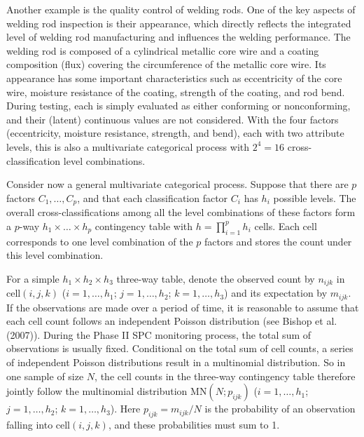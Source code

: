 Another example is the quality control of welding rods. One of the key aspects of
welding rod inspection is their appearance, which directly reflects the integrated
level of welding rod manufacturing and influences the welding performance. The
welding rod is composed of a cylindrical metallic core wire and a coating
composition (flux) covering the circumference of the metallic core wire. Its
appearance has some important characteristics such as eccentricity of the core wire,
moisture resistance of the coating, strength of the coating, and rod bend. During
testing, each is simply evaluated as either conforming or nonconforming, and their
(latent) continuous values are not considered. With the four factors (eccentricity,
moisture resistance, strength, and bend), each with two attribute levels, this is
also a multivariate categorical process with $2^4=16$ cross-classification level
combinations.

Consider now a general multivariate categorical process. Suppose that there are $p$
factors $C_1,\ldots,C_p$, and that each classification factor $C_i$ has $h_i$
possible levels. The overall cross-classifications among all the level combinations
of these factors form a $p$-way $h_1\times\ldots\times h_p$ contingency table with
$h=\prod_{i=1}^p h_i$ cells. Each cell corresponds to one level combination of the
$p$ factors and stores the count under this level combination.

For a simple $h_1\times h_2\times h_3$ three-way table, denote the observed count by
$n_{ijk}$ in cell$(i,j,k)$ ($i=1,\ldots,h_1$; $j=1,\ldots,h_2$; $k=1,\ldots,h_3$)
and its expectation by $m_{ijk}$. If the observations are made over a period of
time, it is reasonable to assume that each cell count follows an independent Poisson
distribution (see Bishop et al. (2007)). During the Phase II SPC monitoring process,
the total sum of observations is usually fixed. Conditional on the total sum of cell
counts, a series of independent Poisson distributions result in a multinomial
distribution. So in one sample of size $N$, the cell counts in the three-way
contingency table therefore jointly follow the multinomial distribution
$\mbox{MN}(N;p_{ijk})$ ($i=1,\ldots,h_1$; $j=1,\ldots,h_2$; $k=1,\ldots,h_3$). Here
$p_{ijk}=m_{ijk}/N$ is the probability of an observation falling into cell$(i,j,k)$,
and these probabilities must sum to 1.


